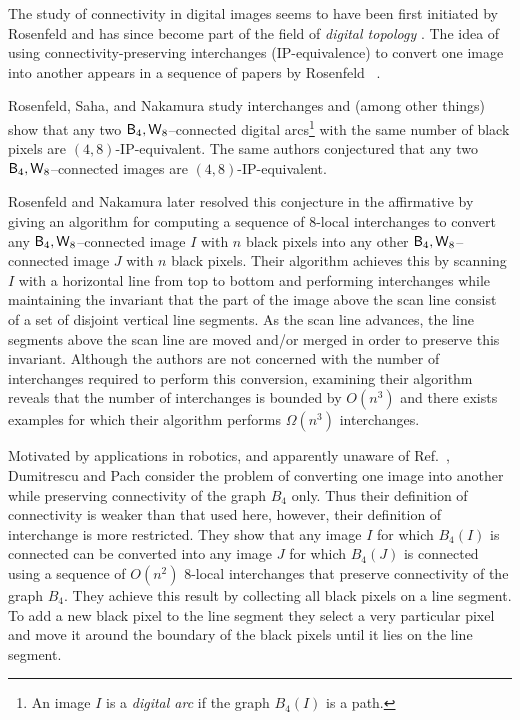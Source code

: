 \documentclass[lotsofwhite,charterfonts]{patmorin}
\newcommand{\foureight}{\ensuremath{\protect\textup{\textsf{B}}_{4},\protect\textup{\textsf{W}}_{8}}}
\begin{document}
The study of connectivity in digital images seems to have been first
initiated by Rosenfeld \cite{r70,r73,r74} and has since become part of
the field of \emph{digital topology} \cite{hr96,kr89}.  The idea of
using connectivity-preserving interchanges (IP-equivalence) to convert
one image into another appears in a sequence of papers by Rosenfeld
\etal\ \cite{rkn98,rn02,rsn01}.

Rosenfeld, Saha, and Nakamura \cite{rsn01} study interchanges and
(among other things) show that any two \foureight--connected digital
arcs\footnote{An image $I$ is a \emph{digital arc} if the graph
$B_4(I)$ is a path.} with the same number of black pixels are
$(4,8)$-IP-equivalent. The same authors conjectured that any two
\foureight--connected images are $(4,8)$-IP-equivalent.

Rosenfeld and Nakamura \cite{rn02} later resolved this conjecture in
the affirmative by giving an algorithm for computing a sequence of
$8$-local interchanges to convert any \foureight--connected image $I$ with $n$
black pixels into any other \foureight--connected image $J$ with $n$
black pixels. Their algorithm achieves this by scanning $I$ with a
horizontal line from top to bottom and performing interchanges while
maintaining the invariant that the part of the image above the scan line
consist of a set of disjoint vertical line segments. As the scan line
advances, the line segments above the scan line are moved and/or
merged in order to preserve this invariant.   Although the authors are
not concerned with the number of interchanges required to perform this
conversion, examining their algorithm reveals that the number of
interchanges is bounded by $O(n^3)$ and there exists examples for
which their algorithm performs $\Omega(n^3)$ interchanges.

Motivated by applications in robotics, and apparently unaware of
Ref.~\cite{rn02}, Dumitrescu and Pach \cite{dp04} consider the problem
of converting one image into another while preserving connectivity of
the graph $B_4$ only.  Thus their definition of connectivity is weaker than that used here, however, their definition of interchange is more restricted. They show that any image $I$ for
which $B_4(I)$ is connected can be converted into any image $J$ for
which $B_4(J)$ is connected using a sequence of $O(n^2)$ 8-local
interchanges that preserve connectivity of the graph
$B_4$. They achieve this result by collecting all black
pixels on a line segment.  To add a new black pixel to the line
segment they select a very particular pixel and move it around the
boundary of the black pixels until it lies on the line segment.
\end{document}

